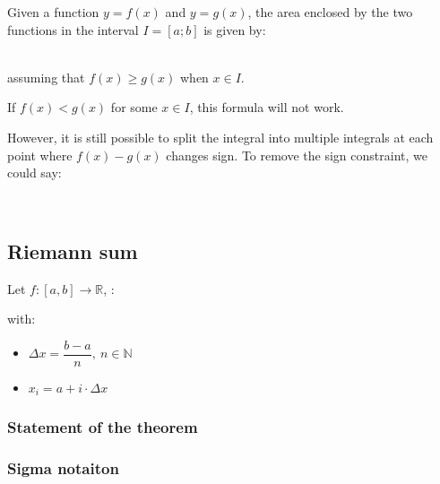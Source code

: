 \documentclass{article}
\begin{document}
\phantom{}

Given a function \(y=f(x)\) and \(y=g(x)\), the area enclosed by the two functions
in the interval \(I=[a;b]\) is given by:

\begin{center}
\end{center} \phantom{}\\
assuming that \(f(x)\geq g(x)\) when \(x\in I\).

\vspace*{.1cm}
If \(f(x)<g(x)\) for some \(x\in I\), this formula will not work.

However, it is still possible to split the integral into multiple integrals at each point where \(f(x) - g(x)\) changes sign.
To remove the sign constraint, we could say:

\begin{center}
\end{center} \phantom{}\\
\wrapfill

\vspace*{-4.5cm}
\subsection{Riemann sum}
Let $f: [a,b] \to \mathbb{R}$, :

with:
\begin{itemize}
    \item $\Delta x = \dfrac{b-a}{n},\ n \in \mathbb{N}$
    \item $x_i = a + i \cdot \Delta x$
\end{itemize}


\subsubsection{Statement of the theorem}

\subsubsection{Sigma notaiton}
\end{document}
